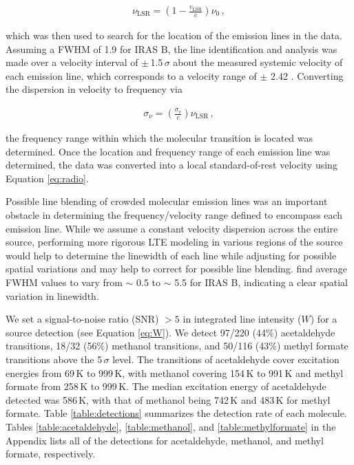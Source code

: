 \documentclass[iop,twocolappendix]{emulateapj}
\begin{document}
\begin{align} \label{eq:radio}
{\nu}_\mathrm{LSR} = \left( 1 - \frac{v_\mathrm{LSR}}{c} \right) {\nu}_0\,,
\end{align}

{\noindent}which was then used to search for the location of the emission lines in the data. Assuming a FWHM of 1.9 {\kms} \citep{Jorgensen2011} for IRAS B, the line identification and analysis was made over a velocity interval of $\pm$\,1.5\,$\sigma$ about the measured systemic velocity of each emission line, which corresponds to a velocity range of $\pm$ 2.42 \kms. Converting the dispersion in velocity to frequency via

\begin{align}
{\sigma}_{\nu} = \left( \frac{{\sigma}_v}{c} \right) {\nu}_\mathrm{LSR}\,,
\end{align}

{\noindent}the frequency range within which the molecular transition is located was determined. Once the location and frequency range of each emission line was determined, the data was converted into a local standard-of-rest velocity using Equation \ref{eq:radio}. 

Possible line blending of crowded molecular emission lines was an important obstacle in determining the frequency/velocity range defined to encompass each emission line. While we assume a constant velocity dispersion across the entire source, performing more rigorous LTE modeling in various regions of the source would help to determine the linewidth of each line while adjusting for possible spatial variations and may help to correct for possible line blending. \citet{Jorgensen2011} find average FWHM values to vary from $\sim$ 0.5 {\kms} to $\sim$ 5.5 {\kms} for IRAS B, indicating a clear spatial variation in linewidth. 

We set a signal-to-noise ratio (SNR) $> 5$ in integrated line intensity ($W$) for a source detection (see Equation \ref{eq:W}). We detect 97/220 (44\%) acetaldehyde transitions, 18/32 (56\%) methanol transitions, and 50/116 (43\%) methyl formate transitions above the 5\,$\sigma$ level. The transitions of acetaldehyde cover excitation energies from 69\,K to 999\,K, with methanol covering 154\,K to 991\,K and methyl formate from 258\,K to 999\,K. The median excitation energy of acetaldehyde detected was 586\,K, with that of methanol being 742\,K and 483\,K for methyl formate. Table \ref{table:detections} summarizes the detection rate of each molecule. Tables \ref{table:acetaldehyde}, \ref{table:methanol}, and \ref{table:methylformate} in the Appendix lists all of the detections for acetaldehyde, methanol, and methyl formate, respectively.
\end{document}
